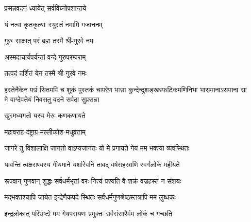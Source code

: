 

{प्रसन्नवदनं ध्यायेत् सर्वविघ्नोपशान्तये}

{यं नत्वा कृतकृत्याः स्युस्तं नमामि गजाननम्}


{गुरुः साक्षात् परं ब्रह्म तस्मै श्री-गुरवे नमः}

{अस्मदाचार्यपर्यन्तां वन्दे गुरुपरम्पराम्}

{तत्पदं दर्शितं येन तस्मै श्री-गुरवे नमः}

{हस्तेनैकेन पद्मं सितमपि च शुकं पुस्तकं चापरेण}
{भासा कुन्देन्दुशङ्खस्फटिकमणिनिभा भासमानाऽसमाना}
{सा मे वाग्देवतेयं निवसतु वदने सर्वदा सुप्रसन्ना}



{खुरमध्यगतो यस्य मेरुः कणकणायते}


{महावराह-दंष्ट्राग्र-मल्लीकोश-मधुव्रताम्}





\twolineshloka
{जागरे तु विशालाक्षि जानतो वाऽप्यजानतः}
{यो मे प्रगायते गेयं मम भक्त्या व्यवस्थितः}%

\twolineshloka
{यावन्ति त्वक्षराण्यस्य गीयमाने यशस्विनि}
{तावद् वर्षसहस्राणि स्वर्गलोके महीयते}%

\twolineshloka
{रूपवान् गुणवान् शुद्धः सर्वधर्मभृतां वरः}
{नित्यं पश्यति वै शक्रं वज्रहस्तं न संशयः}%

\twolineshloka
{मद्भक्तश्चापि जायेत इन्द्रेणैकपदे स्थितः}
{सर्वधर्मगुणश्रेष्ठस्तत्रापि मम लुब्धकः}%

\twolineshloka
{इन्द्रलोकात् परिभ्रष्टो मम गेयपरायणः}
{प्रमुक्तः सर्वसंसारैर्मम लोकं च गच्छति}%

